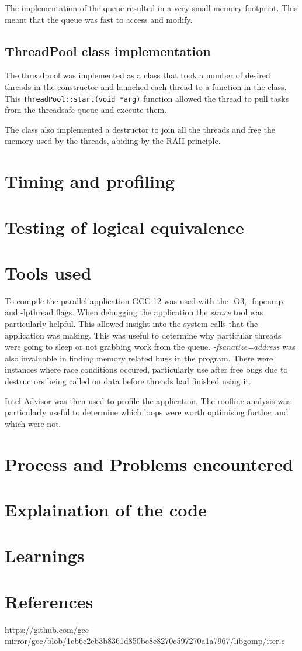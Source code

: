 \documentclass{article}
\begin{document}
The implementation of the queue resulted in a very small memory footprint. This meant that the queue was 
fast to access and modify.

\subsection{ThreadPool class implementation}
The threadpool was implemented as a class that took a number of desired threads in the constructor and launched
each thread to a function in the class. This \texttt{ThreadPool::start(void *arg)} function allowed the
thread to pull tasks from the threadsafe queue and execute them.

The class also implemented a destructor to join all the threads and free the memory used by the threads, abiding
by the RAII principle.


\section{Timing and profiling}

\section{Testing of logical equivalence}

\section{Tools used}

To compile the parallel application GCC-12 was used with the -O3, -fopenmp, and -lpthread flags. When debugging 
the application the \textit{strace} tool was particularly helpful. This allowed insight into the system calls that
the application was making. This was useful to determine why particular threads were going to sleep or not grabbing
work from the queue. \textit{-fsanatize=address} was also invaluable in finding memory related bugs in the program.
There were instances where race conditions occured, particularly use after free bugs due to destructors being called
on data before threads had finished using it.

Intel Advisor was then used to profile the application. The roofline analysis was particularly useful to determine 
which loops were worth optimising further and which were not.

\section{Process and Problems encountered}

\section{Explaination of the code}

\section{Learnings}


\section{References}
https://github.com/gcc-mirror/gcc/blob/1cb6c2eb3b8361d850be8e8270c597270a1a7967/libgomp/iter.c
\end{document}
